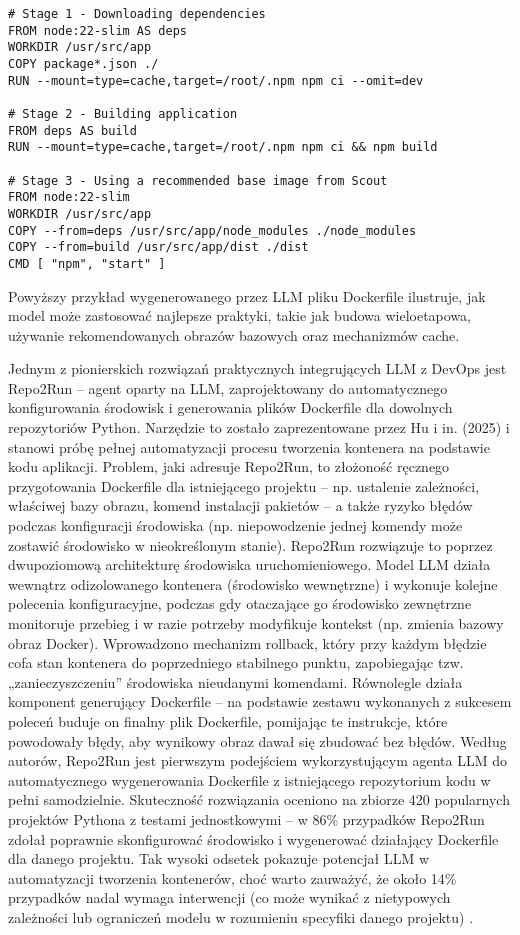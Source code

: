 \begin{lstlisting}
# Stage 1 - Downloading dependencies
FROM node:22-slim AS deps
WORKDIR /usr/src/app
COPY package*.json ./
RUN --mount=type=cache,target=/root/.npm npm ci --omit=dev

# Stage 2 - Building application
FROM deps AS build
RUN --mount=type=cache,target=/root/.npm npm ci && npm build

# Stage 3 - Using a recommended base image from Scout
FROM node:22-slim
WORKDIR /usr/src/app
COPY --from=deps /usr/src/app/node_modules ./node_modules
COPY --from=build /usr/src/app/dist ./dist
CMD [ "npm", "start" ]    
\end{lstlisting}

Powyższy przykład wygenerowanego przez LLM pliku Dockerfile ilustruje, jak model może zastosować najlepsze praktyki, takie jak budowa wieloetapowa, używanie rekomendowanych obrazów bazowych oraz mechanizmów cache.

Jednym z pionierskich rozwiązań praktycznych integrujących LLM z DevOps jest Repo2Run – agent oparty na LLM, zaprojektowany do automatycznego konfigurowania środowisk i generowania plików Dockerfile dla dowolnych repozytoriów Python. Narzędzie to zostało zaprezentowane przez Hu i in. (2025) i stanowi próbę pełnej automatyzacji procesu tworzenia kontenera na podstawie kodu aplikacji. Problem, jaki adresuje Repo2Run, to złożoność ręcznego przygotowania Dockerfile dla istniejącego projektu – np. ustalenie zależności, właściwej bazy obrazu, komend instalacji pakietów – a także ryzyko błędów podczas konfiguracji środowiska (np. niepowodzenie jednej komendy może zostawić środowisko w nieokreślonym stanie). Repo2Run rozwiązuje to poprzez dwupoziomową architekturę środowiska uruchomieniowego. Model LLM działa wewnątrz odizolowanego kontenera (środowisko wewnętrzne) i wykonuje kolejne polecenia konfiguracyjne, podczas gdy otaczające go środowisko zewnętrzne monitoruje przebieg i w razie potrzeby modyfikuje kontekst (np. zmienia bazowy obraz Docker). Wprowadzono mechanizm rollback, który przy każdym błędzie cofa stan kontenera do poprzedniego stabilnego punktu, zapobiegając tzw. „zanieczyszczeniu” środowiska nieudanymi komendami. Równolegle działa komponent generujący Dockerfile – na podstawie zestawu wykonanych z sukcesem poleceń buduje on finalny plik Dockerfile, pomijając te instrukcje, które powodowały błędy, aby wynikowy obraz dawał się zbudować bez błędów. Według autorów, Repo2Run jest pierwszym podejściem wykorzystującym agenta LLM do automatycznego wygenerowania Dockerfile z istniejącego repozytorium kodu w pełni samodzielnie. Skuteczność rozwiązania oceniono na zbiorze 420 popularnych projektów Pythona z testami jednostkowymi – w 86\% przypadków Repo2Run zdołał poprawnie skonfigurować środowisko i wygenerować działający Dockerfile dla danego projektu. Tak wysoki odsetek pokazuje potencjał LLM w automatyzacji tworzenia kontenerów, choć warto zauważyć, że około 14\% przypadków nadal wymaga interwencji (co może wynikać z nietypowych zależności lub ograniczeń modelu w rozumieniu specyfiki danego projektu) \cite{hu_llm-based_2025}.

